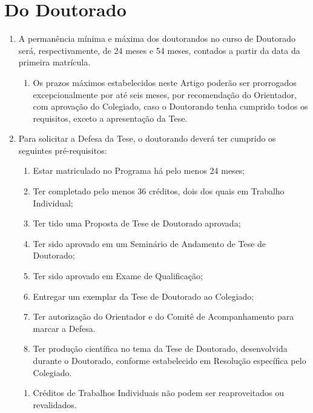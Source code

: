 \documentclass{article}
\newcommand{\singleitem}{\item[Parágrafo Único.]}
\begin{document}
\section{Do Doutorado}
\begin{enumerate}
	\item  A permanência mínima e máxima dos doutorandos no curso de Doutorado será, respectivamente, de 24 meses e 54 meses, contados a partir da data da primeira matrícula.
	\begin{enumerate}
		\singleitem Os prazos máximos estabelecidos neste Artigo poderão ser prorrogados excepcionalmente por até seis meses, por recomendação do Orientador, com aprovação do Colegiado, caso o Doutorando tenha cumprido todos os requisitos, exceto a apresentação da Tese.
	\end{enumerate}
	
	\item Para solicitar a Defesa da Tese, o doutorando deverá ter cumprido os seguintes pré-requisitos:
	\begin{enumerate}[label=\Roman*]
		\item	Estar matriculado no Programa há pelo menos 24 meses;
		\item	Ter completado pelo menos 36 créditos, dois dos quais em Trabalho Individual;
		\item	Ter tido uma Proposta de Tese de Doutorado aprovada;
		\item	Ter sido aprovado em um Seminário de Andamento de Tese de Doutorado;
		\item	Ter sido aprovado em Exame de Qualificação;
		\item	Entregar um exemplar da Tese de Doutorado ao Colegiado;
		\item	Ter autorização do Orientador e do Comitê de Acompanhamento para marcar a Defesa.
		\item	Ter produção científica no tema da Tese de Doutorado, desenvolvida durante o Doutorado, conforme estabelecido em Resolução específica pelo Colegiado.
	\end{enumerate}
	\begin{enumerate}
		\singleitem Créditos de Trabalhos Individuais não podem ser reaproveitados ou revalidados.
	\end{enumerate}


\end{enumerate}
\end{document}
